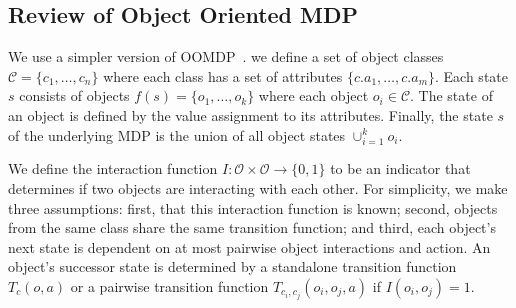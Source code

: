 



\subsection{Review of Object Oriented MDP}

We use a simpler version of OOMDP~\citep{diuk2008object}. we define a set of object classes $\mathcal{C} = \{c_1, \dots, c_n\}$ where each class has a set of attributes $\{c.a_1,\dots,c.a_m\}$. Each state $s$ consists of objects $f(s) = \{o_1,\dots,o_k\}$ where each object $o_i \in \mathcal{C}$. The state of an object is defined by the value assignment to its attributes. Finally, the state  $s$ of the underlying MDP is the union of all object states $\cup_{i=1}^{k} o_i$. 

We define the interaction function $I: \mathcal{O} \times \mathcal{O} \rightarrow \{0,1\}$ to be an indicator that determines if two objects are interacting with each other. For simplicity, we make three assumptions: first, that this interaction function is known; second, objects from the same class share the same transition function; and third, each object's next state is  dependent on at most pairwise object interactions and action.
An object's successor state is determined by a standalone transition function $T_c(o, a)$ or a pairwise transition function $T_{c_i,c_j}(o_i,o_j,a)$ if $I(o_i,o_j) = 1$.

